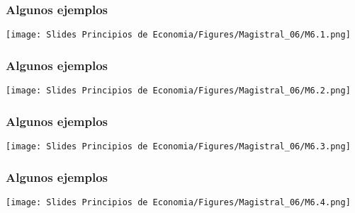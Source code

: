 \documentclass{beamer}
\begin{document}
\begin{frame}
\frametitle{Algunos ejemplos}
    \begin{center}
    \texttt{[image: Slides Principios de Economia/Figures/Magistral\_06/M6.1.png]}
    \end{center}
\end{frame}

\begin{frame}
\frametitle{Algunos ejemplos}
    \begin{center}
    \texttt{[image: Slides Principios de Economia/Figures/Magistral\_06/M6.2.png]}
    \end{center}
\end{frame}

\begin{frame}
\frametitle{Algunos ejemplos}
    \begin{center}
    \texttt{[image: Slides Principios de Economia/Figures/Magistral\_06/M6.3.png]}
    \end{center}
\end{frame}

\begin{frame}
\frametitle{Algunos ejemplos}
    \begin{center}
    \texttt{[image: Slides Principios de Economia/Figures/Magistral\_06/M6.4.png]}
    \end{center}
\end{frame}
\end{document}
